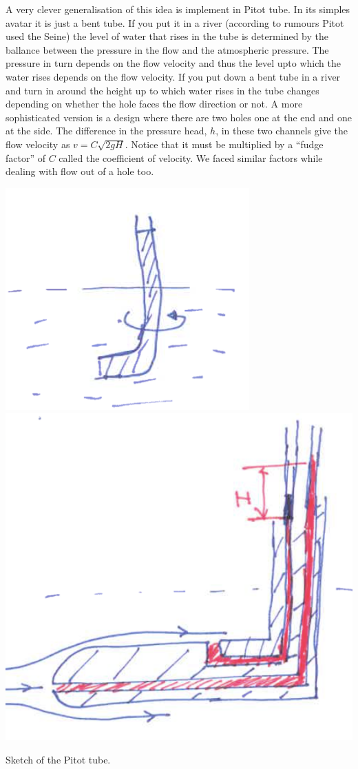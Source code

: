 A very clever generalisation of this idea is implement in Pitot
tube. In its simples avatar it is just a bent tube. If you put it in a
river (according to rumours Pitot used the Seine) the level of water
that rises in the tube is determined by the ballance between the
pressure in the flow and the atmospheric pressure. The pressure in
turn depends on the flow velocity and thus the level upto which the
water rises depends on the flow velocity. If you put down a bent tube
in a river and turn in around the height up to which water rises in
the tube changes depending on whether the hole faces the flow
direction or not. A more sophisticated version is a design where there
are two holes one at the end and one at the side. The difference in
the pressure head, $h$, in these two channels give the flow velocity as
$v = C\sqrt{2gH}$. Notice that it must be multiplied by a ``fudge
factor'' of $C$ called the coefficient of velocity.  We faced similar
factors while dealing with flow out of a hole too. 
\begin{marginfigure}
\includegraphics{figures/pitot1.png}\\
\includegraphics{figures/pitot2.png}
\caption{Sketch of the Pitot tube.}
\label{fig:pitot}
\end{marginfigure}
